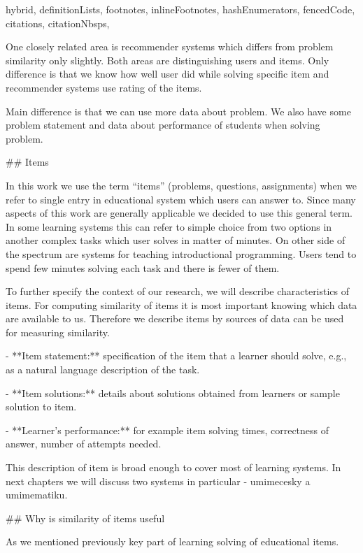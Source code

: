 \documentclass[
  digital, %
  table,   %
  nolof,     %
  nolot,     %
  nocover
]{fithesis3}
\begin{document}
\begin{markdown*}{%
  hybrid,
  definitionLists,
  footnotes,
  inlineFootnotes,
  hashEnumerators,
  fencedCode,
  citations,
  citationNbsps,
}

One closely related area is recommender systems which differs from problem similarity only slightly. Both areas are distinguishing users and items. Only difference is that we know how well user did while solving specific item and recommender systems use rating of the items.


Main difference is that we can use more data about problem. We also have some problem statement and data about performance of students when solving problem.

## Items



In this work we use the term “items” (problems, questions, assignments) when we refer to single entry in educational system which users can answer to. Since many aspects of this work are generally applicable we decided to use this general term. In some learning systems this can refer to simple choice from two options in another complex tasks which user solves in matter of minutes.
On other side of the spectrum are systems for teaching introductional programming. Users tend to spend few minutes solving each task and there is fewer of them.


To further specify the context of our research, we will describe characteristics of items. For computing similarity of items it is most important knowing which data are available to us. Therefore we describe items by sources of data can be used for measuring similarity.

- **Item statement:** specification of the item that a learner should solve, e.g., as a natural language description of the task.

- **Item solutions:** details about solutions obtained from learners or sample solution to item.

- **Learner's performance:** for example item solving times, correctness of answer, number of attempts needed.

This description of item is broad enough to cover most of learning systems. In next chapters we will discuss two systems in particular - umimecesky a umimematiku.

## Why is similarity of items useful

As we mentioned previously key part of learning solving of educational items.


\end{markdown*}
\end{document}
